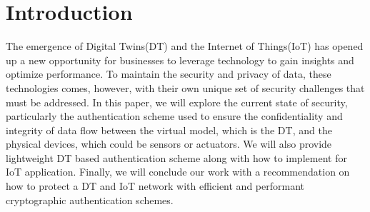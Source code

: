 \section{Introduction}
The emergence of Digital Twins(DT) and the Internet of Things(IoT) has opened up a new opportunity for businesses to leverage technology to gain insights and optimize performance. To maintain the security and privacy of data, these technologies comes, however, with their own unique set of security challenges that must be addressed. In this paper, we will explore the current state of security, particularly the authentication scheme used to ensure the confidentiality and integrity of data flow between the virtual model, which is the DT, and the physical devices, which could be sensors or actuators. We will also provide lightweight DT based authentication scheme along with how to implement for IoT application. Finally, we will conclude our work with a recommendation on how to protect a DT and IoT network with efficient and performant cryptographic authentication schemes. 

